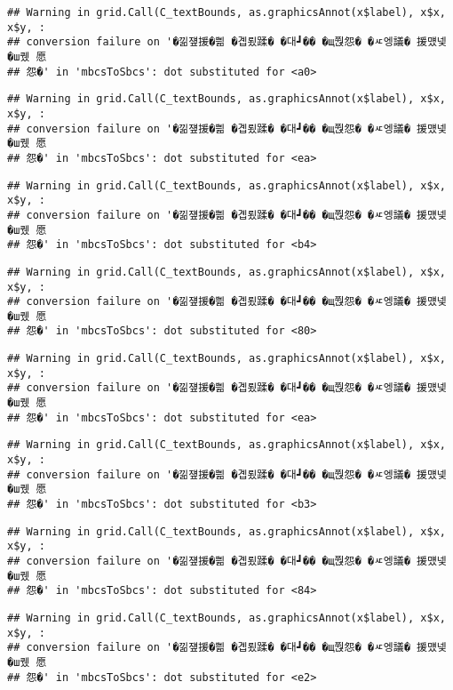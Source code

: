 \documentclass[
]{article}
\begin{document}
\begin{verbatim}
## Warning in grid.Call(C_textBounds, as.graphicsAnnot(x$label), x$x, x$y, :
## conversion failure on '�낆쟾援�쁾 �곕룄蹂� �대┛�� �щ쭩怨� �ㅼ엥議� 援먰넻�ш퀬 愿
## 怨�' in 'mbcsToSbcs': dot substituted for <a0>
\end{verbatim}

\begin{verbatim}
## Warning in grid.Call(C_textBounds, as.graphicsAnnot(x$label), x$x, x$y, :
## conversion failure on '�낆쟾援�쁾 �곕룄蹂� �대┛�� �щ쭩怨� �ㅼ엥議� 援먰넻�ш퀬 愿
## 怨�' in 'mbcsToSbcs': dot substituted for <ea>
\end{verbatim}

\begin{verbatim}
## Warning in grid.Call(C_textBounds, as.graphicsAnnot(x$label), x$x, x$y, :
## conversion failure on '�낆쟾援�쁾 �곕룄蹂� �대┛�� �щ쭩怨� �ㅼ엥議� 援먰넻�ш퀬 愿
## 怨�' in 'mbcsToSbcs': dot substituted for <b4>
\end{verbatim}

\begin{verbatim}
## Warning in grid.Call(C_textBounds, as.graphicsAnnot(x$label), x$x, x$y, :
## conversion failure on '�낆쟾援�쁾 �곕룄蹂� �대┛�� �щ쭩怨� �ㅼ엥議� 援먰넻�ш퀬 愿
## 怨�' in 'mbcsToSbcs': dot substituted for <80>
\end{verbatim}

\begin{verbatim}
## Warning in grid.Call(C_textBounds, as.graphicsAnnot(x$label), x$x, x$y, :
## conversion failure on '�낆쟾援�쁾 �곕룄蹂� �대┛�� �щ쭩怨� �ㅼ엥議� 援먰넻�ш퀬 愿
## 怨�' in 'mbcsToSbcs': dot substituted for <ea>
\end{verbatim}

\begin{verbatim}
## Warning in grid.Call(C_textBounds, as.graphicsAnnot(x$label), x$x, x$y, :
## conversion failure on '�낆쟾援�쁾 �곕룄蹂� �대┛�� �щ쭩怨� �ㅼ엥議� 援먰넻�ш퀬 愿
## 怨�' in 'mbcsToSbcs': dot substituted for <b3>
\end{verbatim}

\begin{verbatim}
## Warning in grid.Call(C_textBounds, as.graphicsAnnot(x$label), x$x, x$y, :
## conversion failure on '�낆쟾援�쁾 �곕룄蹂� �대┛�� �щ쭩怨� �ㅼ엥議� 援먰넻�ш퀬 愿
## 怨�' in 'mbcsToSbcs': dot substituted for <84>
\end{verbatim}

\begin{verbatim}
## Warning in grid.Call(C_textBounds, as.graphicsAnnot(x$label), x$x, x$y, :
## conversion failure on '�낆쟾援�쁾 �곕룄蹂� �대┛�� �щ쭩怨� �ㅼ엥議� 援먰넻�ш퀬 愿
## 怨�' in 'mbcsToSbcs': dot substituted for <e2>
\end{verbatim}
\end{document}
